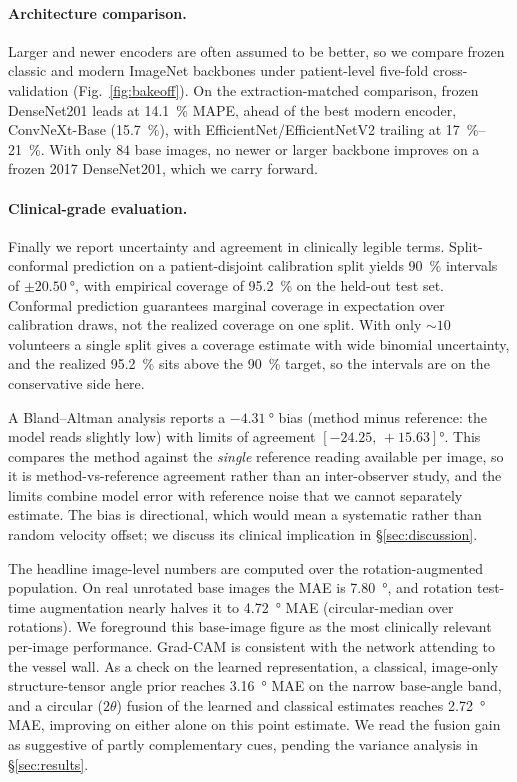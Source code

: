 \paragraph{Architecture comparison.}
Larger and newer encoders are often assumed to be better, so we compare frozen
classic and modern ImageNet backbones under patient-level five-fold
cross-validation (Fig.~\ref{fig:bakeoff}). On the extraction-matched comparison,
frozen DenseNet201 \citep{Huang2017} leads at \SI{14.1}{\percent} MAPE, ahead of
the best modern encoder, ConvNeXt-Base \citep{Liu2022} (\SI{15.7}{\percent}), with
EfficientNet/EfficientNetV2 \citep{Tan2019} trailing at
\SIrange{17}{21}{\percent}. With only $84$ base images, no newer or larger backbone
improves on a frozen 2017 DenseNet201, which we carry forward.

\paragraph{Clinical-grade evaluation.}
Finally we report uncertainty and agreement in clinically legible terms.
Split-conformal prediction \citep{Vovk2005,Lei2018} on a patient-disjoint
calibration split yields \SI{90}{\percent} intervals of $\pm\SI{20.50}{\degree}$,
with empirical coverage of \SI{95.2}{\percent} on the held-out test set. Conformal
prediction guarantees marginal coverage in expectation over calibration draws, not
the realized coverage on one split. With only $\sim\!10$ volunteers a single split
gives a coverage estimate with wide binomial uncertainty, and the realized
\SI{95.2}{\percent} sits above the \SI{90}{\percent} target, so the intervals are
on the conservative side here.

A Bland--Altman analysis \citep{BlandAltman1986} reports a $-\SI{4.31}{\degree}$
bias (method minus reference: the model reads slightly low) with limits of
agreement $[-24.25,\,+15.63]\si{\degree}$. This compares the method against the
\emph{single} reference reading available per image, so it is method-vs-reference
agreement rather than an inter-observer study, and the limits combine model error
with reference noise that we cannot separately estimate. The bias is directional,
which would mean a systematic rather than random velocity offset; we discuss its
clinical implication in \S\ref{sec:discussion}.

The headline image-level numbers are computed over the rotation-augmented
population. On real unrotated base images the MAE is \SI{7.80}{\degree}, and
rotation test-time augmentation nearly halves it to \SI{4.72}{\degree} MAE
(circular-median over rotations). We foreground this base-image figure as the most
clinically relevant per-image performance. Grad-CAM \citep{Selvaraju2017} is
consistent with the network attending to the vessel wall. As a check on the
learned representation, a classical, image-only structure-tensor angle prior
reaches \SI{3.16}{\degree} MAE on the narrow base-angle band, and a circular
($2\theta$) fusion of the learned and classical estimates reaches
\SI{2.72}{\degree} MAE, improving on either alone on this point estimate. We read
the fusion gain as suggestive of partly complementary cues, pending the variance
analysis in \S\ref{sec:results}.

